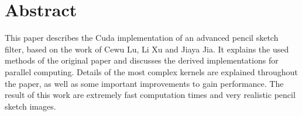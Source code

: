 \section*{Abstract} 
This paper describes the Cuda implementation of an advanced pencil sketch
filter, based on the work of Cewu Lu, Li Xu and Jiaya Jia\cite{mainPaper}.  It
explains the used methods of the original paper and discusses the derived
implementations for parallel computing. Details of the most complex
kernels are explained throughout the paper, as well as some important 
improvements to gain performance. The result of this work are extremely
fast computation times and very realistic pencil sketch images.

